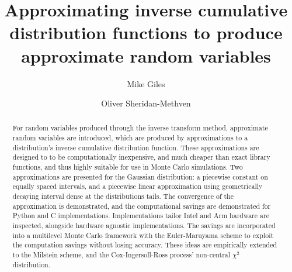 \documentclass[manuscript]{acmart}
\title{Approximating inverse cumulative distribution functions to produce approximate random variables}
\author{Mike Giles}
\author{Oliver Sheridan-Methven}
\affiliation{%
\institution{Mathematical Institute, Oxford University}
\city{Oxford}
\country{UK}}
\begin{document}
\linenumbers
\begin{abstract}
For random variables produced through the inverse transform method, approximate random variables are introduced, which are produced by approximations to a distribution's inverse cumulative distribution function. These approximations are designed to to be computationally inexpensive, and much cheaper than exact library functions, and thus highly suitable for use in Monte Carlo simulations. Two approximations are presented for the Gaussian distribution: a piecewise constant on equally spaced intervals, and a piecewise linear approximation using geometrically decaying interval dense at the distributions tails. The convergence of the approximation is demonstrated, and the computational savings are demonstrated for Python and C implementations. Implementations tailor Intel and Arm hardware are inspected, alongside hardware agnostic implementations. The savings are incorporated into a multilevel Monte Carlo framework with the Euler-Maruyama scheme to exploit the computation savings without losing accuracy. These ideas are empirically extended to the Milstein scheme, and the Cox-Ingersoll-Ross process' non-central $ \chi^2 $ distribution. 
\end{abstract}
\maketitle
\end{document}
